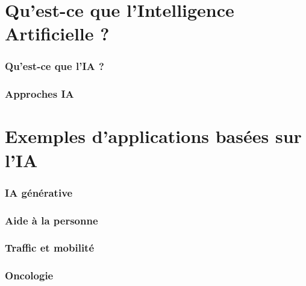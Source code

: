 \localized

\tableofcontentslide[onlyparts]

\begin{bibliographysection}

\part[subtitle={Concepts et modèles clés de l'IA dans les applications modernes}]{Qu'est-ce que l'Intelligence Artificielle ?}

\section{Qu'est-ce que l'IA ?}
\localized
\section{Approches IA}
\localized
\localized
\localized
\localized
\localized
\localized

\part[subtitle={Principalement issus des projets du laboratoire CIAD}]{Exemples d'applications basées sur l'IA}

\section{IA générative}
\localized

\section{Aide à la personne}
\localized
\localized

\section{Traffic et mobilité}
\localized

\section{Oncologie}
\localized


\end{bibliographysection}

